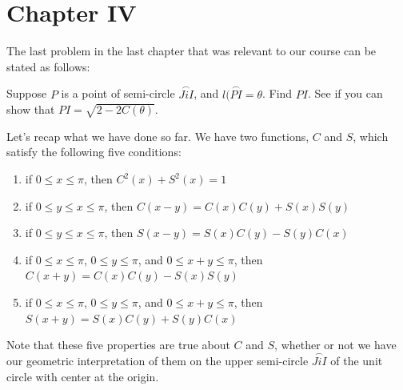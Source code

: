 \documentclass[english]{book}
\newcommand{\arc}[1]{\overset{\frown}{#1} }
\begin{document}
\chapter*{Chapter IV}


The last problem in the last chapter that was relevant to our course can be stated as follows:

Suppose $P$ is a point of semi-circle $\arc{JiI}$, and $l(\arc{PI} = \theta$. Find $PI$. See if you can show that $PI = \sqrt{2-2C(\theta)}$.

Let's recap what we have done so far. We have two functions, $C$ and $S$, which satisfy the following five conditions:
\begin{enumerate}[\hspace{1cm}1)]
  \item if $0 \leq x \leq \pi$, then $C^{2}(x) + S^{2}(x) = 1$ 
  \item if $0 \leq y \leq x \leq \pi$, then $C(x-y) = C(x)C(y) + S(x)S(y)$
  \item if $0 \leq y \leq x \leq \pi$, then $S(x-y) = S(x)C(y) - S(y)C(x)$
  \item if $0 \leq x \leq \pi$, $0 \leq y \leq \pi$, and $0 \leq x + y \leq \pi$, then $C(x + y) = C(x)C(y) - S(x)S(y)$
  \item if $0 \leq x \leq \pi$, $0 \leq y \leq \pi$, and $0 \leq x + y \leq \pi$, then $S(x+y) = S(x)C(y) + S(y)C(x)$
\end{enumerate}

Note that these five properties are true about $C$ and $S$, whether or not we have our geometric interpretation of them on the upper semi-circle $\arc{JiI}$ of the unit circle with center at the origin.
\end{document}
